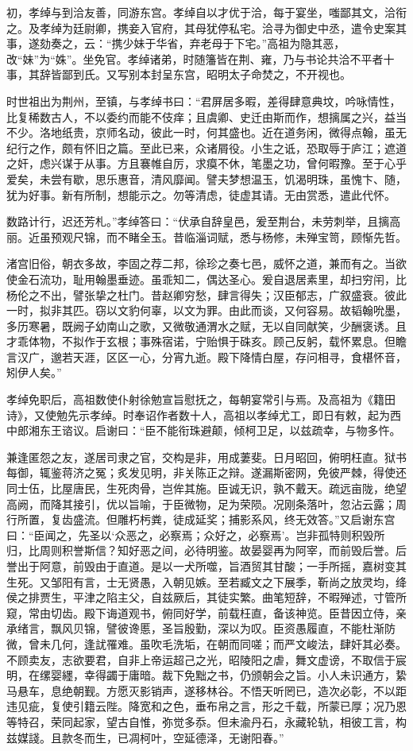 \documentclass[12pt,UTF8]{ctexbook}
\begin{document}
初，孝绰与到洽友善，同游东宫。孝绰自以才优于洽，每于宴坐，嗤鄙其文，洽衔之。及孝绰为廷尉卿，携妾入官府，其母犹停私宅。洽寻为御史中丞，遣令史案其事，遂劾奏之，云：“携少妹于华省，弃老母于下宅。”高祖为隐其恶，改“妹”为“姝”。坐免官。孝绰诸弟，时随籓皆在荆、雍，乃与书论共洽不平者十事，其辞皆鄙到氏。又写别本封呈东宫，昭明太子命焚之，不开视也。

时世祖出为荆州，至镇，与孝绰书曰：“君屏居多暇，差得肆意典坟，吟咏情性，比复稀数古人，不以委约而能不伎痒；且虞卿、史迁由斯而作，想摛属之兴，益当不少。洛地纸贵，京师名动，彼此一时，何其盛也。近在道务闲，微得点翰，虽无纪行之作，颇有怀旧之篇。至此已来，众诸屑役。小生之诋，恐取辱于庐江；遮道之奸，虑兴谋于从事。方且褰帷自厉，求瘼不休，笔墨之功，曾何暇豫。至于心乎爱矣，未尝有歇，思乐惠音，清风靡闻。譬夫梦想温玉，饥渴明珠，虽愧卞、随，犹为好事。新有所制，想能示之。勿等清虑，徒虚其请。无由赏悉，遣此代怀。

数路计行，迟还芳札。”孝绰答曰：“伏承自辞皇邑，爰至荆台，未劳刺举，且摛高丽。近虽预观尺锦，而不睹全玉。昔临淄词赋，悉与杨修，未殚宝笥，顾惭先哲。

渚宫旧俗，朝衣多故，李固之荐二邦，徐珍之奏七邑，威怀之道，兼而有之。当欲使金石流功，耻用翰墨垂迹。虽乖知二，偶达圣心。爰自退居素里，却扫穷闬，比杨伦之不出，譬张挚之杜门。昔赵卿穷愁，肆言得失；汉臣郁志，广叙盛衰。彼此一时，拟非其匹。窃以文豹何辜，以文为罪。由此而谈，又何容易。故韬翰吮墨，多历寒暑，既阙子幼南山之歌，又微敬通渭水之赋，无以自同献笑，少酬褒诱。且才乖体物，不拟作于玄根；事殊宿诺，宁贻惧于硃亥。顾己反躬，载怀累息。但瞻言汉广，邈若天涯，区区一心，分宵九逝。殿下降情白屋，存问相寻，食椹怀音，矧伊人矣。”

孝绰免职后，高祖数使仆射徐勉宣旨慰抚之，每朝宴常引与焉。及高祖为《籍田诗》，又使勉先示孝绰。时奉诏作者数十人，高祖以孝绰尤工，即日有敕，起为西中郎湘东王谘议。启谢曰：“臣不能衔珠避颠，倾柯卫足，以兹疏幸，与物多忤。

兼逢匿怨之友，遂居司隶之官，交构是非，用成萋斐。日月昭回，俯明枉直。狱书每御，辄鉴蒋济之冤；炙发见明，非关陈正之辩。遂漏斯密网，免彼严棘，得使还同士伍，比屋唐民，生死肉骨，岂侔其施。臣诚无识，孰不戴天。疏远亩陇，绝望高阙，而降其接引，优以旨喻，于臣微物，足为荣陨。况刚条落叶，忽沾云露；周行所置，复齿盛流。但雕朽杇粪，徒成延奖；捕影系风，终无效答。”又启谢东宫曰：“臣闻之，先圣以‘众恶之，必察焉；众好之，必察焉’。岂非孤特则积毁所归，比周则积誉斯信？知好恶之间，必待明鉴。故晏婴再为阿宰，而前毁后誉。后誉出于阿意，前毁由于直道。是以一犬所噬，旨酒贸其甘酸；一手所摇，嘉树变其生死。又邹阳有言，士无贤愚，入朝见嫉。至若臧文之下展季，靳尚之放灵均，绛侯之排贾生，平津之陷主父，自兹厥后，其徒实繁。曲笔短辞，不暇殚述，寸管所窥，常由切齿。殿下诲道观书，俯同好学，前载枉直，备该神览。臣昔因立侍，亲承绪言，飘风贝锦，譬彼谗慝，圣旨殷勤，深以为叹。臣资愚履直，不能杜渐防微，曾未几何，逢訧罹难。虽吹毛洗垢，在朝而同嗟；而严文峻法，肆奸其必奏。不顾卖友，志欲要君，自非上帝运超己之光，昭陵阳之虐，舞文虚谤，不取信于宸明，在缧婴纆，幸得蠲于庸暗。裁下免黜之书，仍颁朝会之旨。小人未识通方，絷马悬车，息绝朝觐。方愿灭影销声，遂移林谷。不悟天听罔已，造次必彰，不以距违见疵，复使引籍云陛。降宽和之色，垂布帛之言，形之千载，所蒙已厚；况乃恩等特召，荣同起家，望古自惟，弥觉多忝。但未渝丹石，永藏轮轨，相彼工言，构兹媒諓。且款冬而生，已凋柯叶，空延德泽，无谢阳春。”
\end{document}
